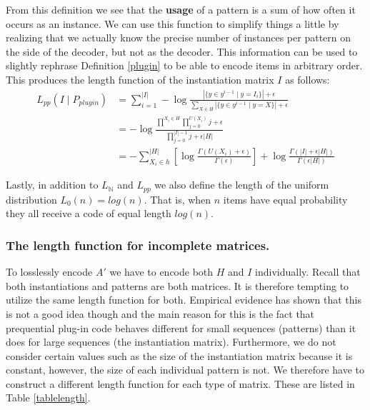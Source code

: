 \documentclass{llncs}
\begin{document}
From this definition we see that the \textbf{usage} of a pattern is a sum of how often it occurs as an instance. We can use this function to simplify things a little by realizing that we actually know the precise number of instances per pattern on the side of the decoder, but not as the decoder. This information can be used to slightly rephrase Definition \ref{plugin} to be able to encode items in arbitrary order. This produces the length function of the instantiation matrix ${I}$ as follows:
\begin{align*}
	L_{pp}({I}\mid P_{plugin}) &= \sum^{|{I}|}_{i=1} -\log \frac{|\{y \in y^{i-1} \mid y = {I}_i\}| + \epsilon }{\sum_{X \in H}|\{y \in y^{i-1} \mid y = X\}| + \epsilon}\\
	&= -\log \frac{\prod^{X_i\in H} \prod^{U(X_i)}_{j=0} j + \epsilon}{\prod^{|{I}|-1}_{j=0} j + \epsilon|H|} \\
	&= -\sum^{|H|}_{X_i \in h} \left[ \log \frac{\Gamma(U(X_i)+\epsilon)}{\Gamma(\epsilon)}\right] + \log \frac{\Gamma(|{I}| + \epsilon|H|)}{\Gamma(\epsilon|H|)}
\end{align*}

Lastly, in addition to $L_{\mathbb{N}}$ and $L_{pp}$ we also define the length of the uniform distribution $L_0(n)=log(n)$. That is, when $n$ items have equal probability they all receive a code of equal length $log(n)$.

\subsubsection{The length function for incomplete matrices.}

To losslessly encode $A'$ we have to encode both $H$ and ${I}$ individually. Recall that both instantiations and patterns are both matrices. It is therefore tempting to utilize the same length function for both. Empirical evidence has shown that this is not a good idea though and the main reason for this is the fact that prequential plug-in code behaves different for small sequences (patterns) than it does for large sequences (the instantiation matrix). Furthermore, we do not consider certain values such as the size of the instantiation matrix because it is constant, however, the size of each individual pattern is not. We therefore have to construct a different length function for each type of matrix. These are listed in Table \ref{tablelength}.
\end{document}
